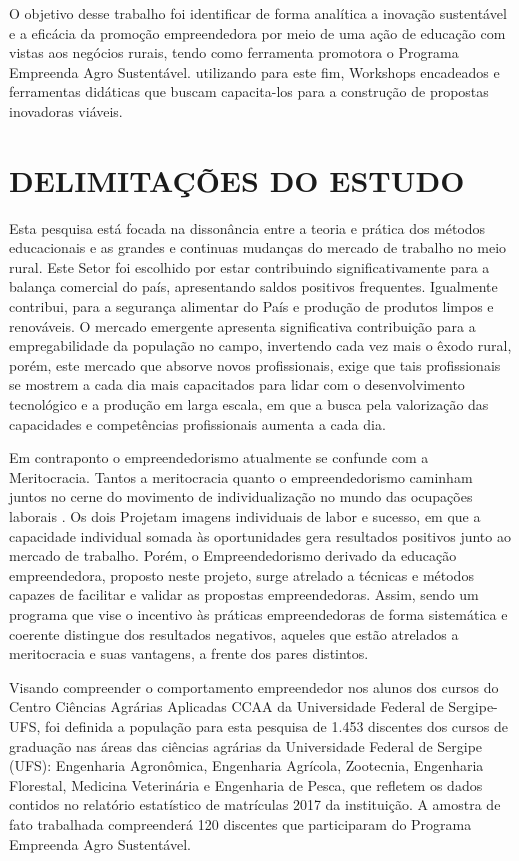 O objetivo desse trabalho foi identificar de forma analítica a inovação sustentável e a eficácia da promoção empreendedora por meio de uma ação de educação com vistas aos negócios rurais, tendo como ferramenta promotora o Programa Empreenda Agro Sustentável. utilizando para este fim, Workshops encadeados e ferramentas didáticas que buscam capacita-los para a construção de propostas inovadoras viáveis.


\section{DELIMITAÇÕES DO ESTUDO}

Esta pesquisa está focada na dissonância entre a teoria e prática dos métodos educacionais e as grandes e continuas mudanças do mercado de trabalho no meio rural. Este Setor foi escolhido por estar contribuindo significativamente para a balança comercial do país, apresentando saldos positivos frequentes. Igualmente contribui, para a segurança alimentar do País e produção de produtos limpos e renováveis. O mercado emergente apresenta significativa contribuição para a empregabilidade da população no campo, invertendo cada vez mais o êxodo rural, porém, este mercado que absorve novos profissionais, exige que tais profissionais se mostrem a cada dia mais capacitados para lidar com o desenvolvimento tecnológico e a produção em larga escala, em que a busca pela valorização das capacidades e competências profissionais aumenta a cada dia. 

Em contraponto o empreendedorismo atualmente se confunde com a Meritocracia. Tantos a meritocracia quanto o empreendedorismo caminham juntos no cerne do movimento de individualização no mundo das ocupações laborais \cite{costa_novo_2019}. Os dois Projetam imagens individuais de labor e sucesso, em que a capacidade individual somada às oportunidades gera resultados positivos junto ao mercado de trabalho. Porém, o Empreendedorismo derivado da educação empreendedora, proposto neste projeto, surge atrelado a técnicas e métodos capazes de facilitar e validar as propostas empreendedoras. Assim, sendo um programa que vise o incentivo às práticas empreendedoras de forma sistemática e coerente distingue dos resultados negativos, aqueles que estão atrelados a meritocracia e suas vantagens, a frente dos pares distintos.

Visando compreender o comportamento empreendedor nos alunos dos cursos do Centro
Ciências Agrárias Aplicadas CCAA da Universidade Federal de Sergipe-UFS, foi definida a população para esta pesquisa de 1.453 discentes dos cursos de graduação nas áreas das ciências agrárias da Universidade Federal de Sergipe (UFS): Engenharia Agronômica, Engenharia Agrícola, Zootecnia, Engenharia Florestal, Medicina Veterinária e Engenharia de Pesca, que refletem os dados contidos no relatório estatístico de matrículas 2017 da instituição. A amostra de fato trabalhada compreenderá 120 discentes que participaram do Programa Empreenda Agro Sustentável.

